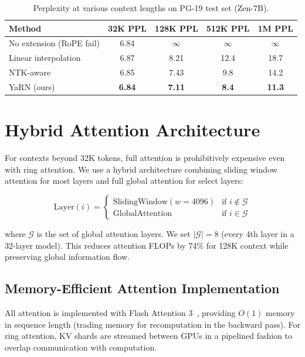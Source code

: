 \documentclass[11pt,a4paper]{article}
\begin{document}
\begin{table}[H]
\centering
\begin{tabular}{lcccc}
\toprule
\textbf{Method} & \textbf{32K PPL} & \textbf{128K PPL} & \textbf{512K PPL} & \textbf{1M PPL} \\
\midrule
No extension (RoPE fail) & 6.84 & $\infty$ & $\infty$ & $\infty$ \\
Linear interpolation & 6.87 & 8.21 & 12.4 & 18.7 \\
NTK-aware & 6.85 & 7.43 & 9.8 & 14.2 \\
YaRN (ours) & \textbf{6.84} & \textbf{7.11} & \textbf{8.4} & \textbf{11.3} \\
\bottomrule
\end{tabular}
\caption{Perplexity at various context lengths on PG-19 test set (Zen-7B).}
\end{table}

\section{Hybrid Attention Architecture}

For contexts beyond 32K tokens, full attention is prohibitively expensive even
with ring attention. We use a hybrid architecture combining sliding window attention
for most layers and full global attention for select layers:

\begin{equation}
\text{Layer}(i) = \begin{cases} \text{SlidingWindow}(w=4096) & \text{if } i \notin \mathcal{G} \\ \text{GlobalAttention} & \text{if } i \in \mathcal{G} \end{cases}
\end{equation}

where $\mathcal{G}$ is the set of global attention layers. We set $|\mathcal{G}| = 8$
(every 4th layer in a 32-layer model). This reduces attention FLOPs by 74\% for
128K context while preserving global information flow.

\subsection{Memory-Efficient Attention Implementation}

All attention is implemented with Flash Attention 3~\cite{shah2023flashattention3},
providing $O(1)$ memory in sequence length (trading memory for recomputation
in the backward pass). For ring attention, KV shards are streamed between GPUs
in a pipelined fashion to overlap communication with computation.
\end{document}
